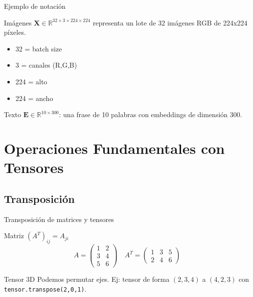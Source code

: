 \documentclass[aspectratio=169, 10pt, xcolor=table]{beamer}
\begin{document}
\begin{frame}{Ejemplo de notación}
    \begin{exampleblock}{Imágenes}
        $\mathbf{X} \in \mathbb{R}^{32 \times 3 \times 224 \times 224}$ representa un lote de 32 imágenes RGB de 224x224 píxeles.
        \begin{itemize}
            \item 32 = batch size
            \item 3 = canales (R,G,B)
            \item 224 = alto
            \item 224 = ancho
        \end{itemize}
    \end{exampleblock}
    \begin{exampleblock}{Texto}
        $\mathbf{E} \in \mathbb{R}^{10 \times 300}$: una frase de 10 palabras con embeddings de dimensión 300.
    \end{exampleblock}
\end{frame}

\section{Operaciones Fundamentales con Tensores}

\subsection{Transposición}

\begin{frame}{Transposición de matrices y tensores}
    \begin{block}{Matriz}
        $(A^T)_{ij} = A_{ji}$
        \[
        A = \begin{pmatrix}1&2\\3&4\\5&6\end{pmatrix} \quad A^T = \begin{pmatrix}1&3&5\\2&4&6\end{pmatrix}
        \]
    \end{block}
    \begin{block}{Tensor 3D}
        Podemos permutar ejes. Ej: tensor de forma $(2,3,4)$ a $(4,2,3)$ con \texttt{tensor.transpose(2,0,1)}.
    \end{block}
\end{frame}
\end{document}
